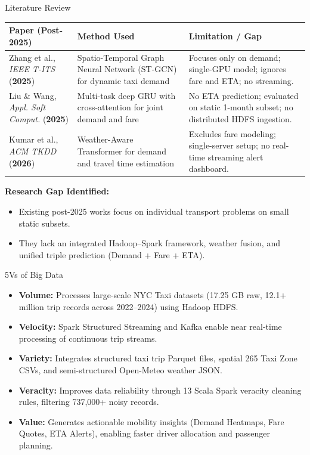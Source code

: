 \documentclass[aspectratio=169]{beamer}
\begin{document}
\begin{frame}{Literature Review}
  \scriptsize
  \begin{tabular}{p{} p{} p{}}
    \toprule
    \textbf{Paper (Post-2025)} & \textbf{Method Used} & \textbf{Limitation / Gap} \\
    \midrule
    Zhang et al., \emph{IEEE T-ITS} (\textbf{2025}) &
    Spatio-Temporal Graph Neural Network (ST-GCN) for dynamic taxi demand &
    Focuses only on demand; single-GPU model; ignores fare and ETA; no streaming. \\
    \addlinespace
    Liu \& Wang, \emph{Appl. Soft Comput.} (\textbf{2025}) &
    Multi-task deep GRU with cross-attention for joint demand and fare &
    No ETA prediction; evaluated on static 1-month subset; no distributed HDFS ingestion. \\
    \addlinespace
    Kumar et al., \emph{ACM TKDD} (\textbf{2026}) &
    Weather-Aware Transformer for demand and travel time estimation &
    Excludes fare modeling; single-server setup; no real-time streaming alert dashboard. \\
    \bottomrule
  \end{tabular}
  \vspace{6pt}
  \normalsize
  \textbf{Research Gap Identified:}
  \begin{itemize}
    \item Existing post-2025 works focus on individual transport problems on small static subsets.
    \item They lack an integrated Hadoop--Spark framework, weather fusion, and unified triple prediction (Demand + Fare + ETA).
  \end{itemize}
\end{frame}

\begin{frame}{5Vs of Big Data}
  \begin{itemize}
    \item \textbf{Volume:} Processes large-scale NYC Taxi datasets (17.25 GB raw, 12.1+ million trip records across 2022--2024) using Hadoop HDFS.
    \item \textbf{Velocity:} Spark Structured Streaming and Kafka enable near real-time processing of continuous trip streams.
    \item \textbf{Variety:} Integrates structured taxi trip Parquet files, spatial 265 Taxi Zone CSVs, and semi-structured Open-Meteo weather JSON.
    \item \textbf{Veracity:} Improves data reliability through 13 Scala Spark veracity cleaning rules, filtering 737,000+ noisy records.
    \item \textbf{Value:} Generates actionable mobility insights (Demand Heatmaps, Fare Quotes, ETA Alerts), enabling faster driver allocation and passenger planning.
  \end{itemize}
\end{frame}
\end{document}
